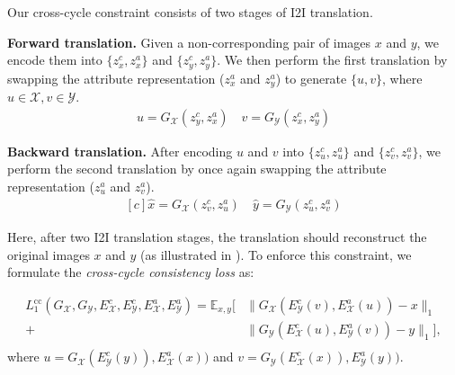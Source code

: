 \documentclass[runningheads]{llncs}
\begin{document}
Our cross-cycle constraint consists of two stages of I2I translation.

\noindent \textbf{Forward translation.} Given a non-corresponding pair of images $x$ and $y$,  we encode them into $\{z_x^{c}, z_x^{a}\}$ and $\{z_y^{c}, z_y^{a}\}$.
%
We then perform the first translation by swapping the attribute representation (\ie $z_x^{a}$ and $z_y^{a}$) to generate $\{u,v\}$, where $u\in \mathcal{X}, v \in \mathcal{Y}$.
%
\vspace{\eqmargin}
\begin{equation}
\begin{aligned}
u = G_\mathcal{X}(z_y^c, z_x^a)\quad
v = G_\mathcal{Y}(z_x^c, z_y^a)
\end{aligned}
\end{equation}
\vspace{\eqmargin}

\noindent \textbf{Backward translation.} After encoding $u$ and $v$ into $\{z_u^c,z_u^a\}$ and $\{z_v^c,z_v^a\}$, we perform the second translation by once again swapping the attribute representation (\ie $z_u^a$ and $z_v^a$).
%
\vspace{\eqmargin}
\begin{equation}
\begin{aligned}[c]
\hat{x} = G_\mathcal{X}(z_v^c, z_u^a)\quad
\hat{y} = G_\mathcal{Y}(z_u^c, z_v^a)
\end{aligned}
\end{equation}
\vspace{\eqmargin}

Here, after two I2I translation stages, the translation should reconstruct the original images $x$ and $y$ (as illustrated in ).
%
To enforce this constraint, we formulate the \textit{cross-cycle consistency loss} as:

\vspace{\eqmargin}
\begin{equation}
\begin{aligned}
L_1^{\mathrm{cc}}(G_\mathcal{X},G_\mathcal{Y},E_\mathcal{X}^c,E_\mathcal{Y}^c,E_\mathcal{X}^a,E_\mathcal{Y}^a) = 
\mathbb{E}_{x,y}[&\lVert G_\mathcal{X}(E_\mathcal{Y}^c(v),E_\mathcal{X}^a(u) )-x \lVert_{1} \\
+ &\lVert G_\mathcal{Y}(E_\mathcal{X}^c(u),E_\mathcal{Y}^a(v) )-y \lVert_{1}],\\
\end{aligned}
\end{equation}
\vspace{\eqmargin}
where $u=G_\mathcal{X}(E_\mathcal{Y}^c(y)),E_\mathcal{X}^a(x))$ and $v=G_\mathcal{Y}(E_\mathcal{X}^c(x)),E_\mathcal{Y}^a(y))$.
\end{document}
